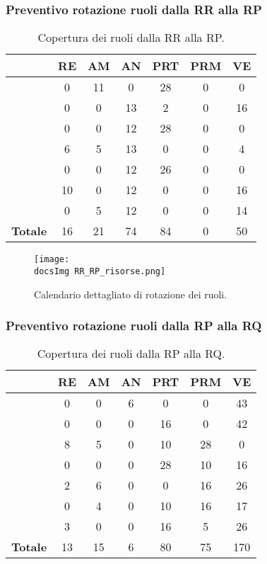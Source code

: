 {{	\subsubsection{Preventivo rotazione ruoli dalla RR alla RP}{
	\begin{table}[h!]
		\begin{center}
			\begin{tabular}{l c c c c c c}				
				\toprule
				&	RE& AM& AN& PRT& PRM& VE \\ 
				\midrule
				\BM	& 0	& 11& 0  & 28 & 0 & 0\\ 
				\BA	& 0	& 0	& 13 & 2  & 0 & 16 \\
				\CD	& 0	& 0	& 12 & 28 &0 & 0\\ 
				\LS	& 6	& 5	& 13 & 0  &0 & 4\\
				\PV & 0	& 0	& 12 & 26 &0 & 0\\
				\ZF & 10	& 0	& 12 & 0  &0 & 16\\
				\ZE & 0	& 5	& 12 & 0  &0	 & 14\\ \hline
				\textbf{Totale}&	 16 &	21 &		74	&	84 &		0 & 50\\
				\bottomrule
			\end{tabular}
		\end{center}	
		\caption{Copertura dei ruoli dalla RR alla RP.}
	\end{table}	
	
	\begin{figure}[h!]
	\centering
		\texttt{[image: \\docsImg RR\_RP\_risorse.png]}
		
		\caption{Calendario dettagliato di rotazione dei ruoli.}	
		\label{rrrpRuoli}	
	\end{figure} 
	}
	\newpage
	\subsubsection{Preventivo rotazione ruoli dalla RP alla RQ}{
	\begin{table}[h!]
		\begin{center}
			\begin{tabular}{l c c c c c c}				
				\toprule
				&	RE& AM& AN& PRT& PRM& VE \\ 
				\midrule
				\BM	&	0	&	0	&	6	&	0	&	0	&	43\\ 
				\BA	&	0	&	0	&	0	&	16	&	0	&	42\\
				\CD	&	8	&	5	&	0	&	10	&	28	&	0\\ 
				\LS	&	0	&	0	&	0	&	28	&	10	&	16\\
				\PV &	2	&	6	&	0	&	0	&	16	&	26\\
				\ZF 	&	0	&	4	&	0	&	10	&	16	&	17\\
				\ZE &	3	&	0	&	0	&	16	&	5	&	26\\ \hline
				\textbf{Totale}&	 13 &	15 &	6	&	80 &		75 & 170\\
				\bottomrule
			\end{tabular}
		\end{center}	
		\caption{Copertura dei ruoli dalla RP alla RQ.}
	\end{table}	
	
}}}
